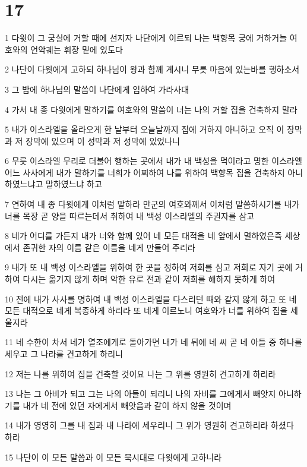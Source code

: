 \chapter{17}

\par 1 다윗이 그 궁실에 거할 때에 선지자 나단에게 이르되 나는 백향목 궁에 거하거늘 여호와의 언악궤는 휘장 밑에 있도다
\par 2 나단이 다윗에게 고하되 하나님이 왕과 함께 계시니 무릇 마음에 있는바를 행하소서
\par 3 그 밤에 하나님의 말씀이 나단에게 임하여 가라사대
\par 4 가서 내 종 다윗에게 말하기를 여호와의 말씀이 너는 나의 거할 집을 건축하지 말라
\par 5 내가 이스라엘을 올라오게 한 날부터 오늘날까지 집에 거하지 아니하고 오직 이 장막과 저 장막에 있으며 이 성막과 저 성막에 있었나니
\par 6 무릇 이스라엘 무리로 더불어 행하는 곳에서 내가 내 백성을 먹이라고 명한 이스라엘 어느 사사에게 내가 말하기를 너희가 어찌하여 나를 위하여 백향목 집을 건축하지 아니하였느냐고 말하였느냐 하고
\par 7 연하여 내 종 다윗에게 이처럼 말하라 만군의 여호와께서 이처럼 말씀하시기를 내가 너를 목장 곧 양을 따르는데서 취하여 내 백성 이스라엘의 주권자를 삼고
\par 8 네가 어디를 가든지 내가 너와 함께 있어 네 모든 대적을 네 앞에서 멸하였은즉 세상에서 존귀한 자의 이름 같은 이름을 네게 만들어 주리라
\par 9 내가 또 내 백성 이스라엘을 위하여 한 곳을 정하여 저희를 심고 저희로 자기 곳에 거하여 다시는 옮기지 않게 하며 악한 유로 전과 같이 저희를 해하지 못하게 하여
\par 10 전에 내가 사사를 명하여 내 백성 이스라엘을 다스리던 때와 같지 않게 하고 또 네 모든 대적으로 네게 복종하게 하리라 또 네게 이르노니 여호와가 너를 위하여 집을 세울지라
\par 11 네 수한이 차서 네가 열조에게로 돌아가면 내가 네 뒤에 네 씨 곧 네 아들 중 하나를 세우고 그 나라를 견고하게 하리니
\par 12 저는 나를 위하여 집을 건축할 것이요 나는 그 위를 영원히 견고하게 하리라
\par 13 나는 그 아비가 되고 그는 나의 아들이 되리니 나의 자비를 그에게서 빼앗지 아니하기를 내가 네 전에 있던 자에게서 빼앗음과 같이 하지 않을 것이며
\par 14 내가 영영히 그를 내 집과 내 나라에 세우리니 그 위가 영원히 견고하리라 하셨다 하라
\par 15 나단이 이 모든 말씀과 이 모든 묵시대로 다윗에게 고하니라
